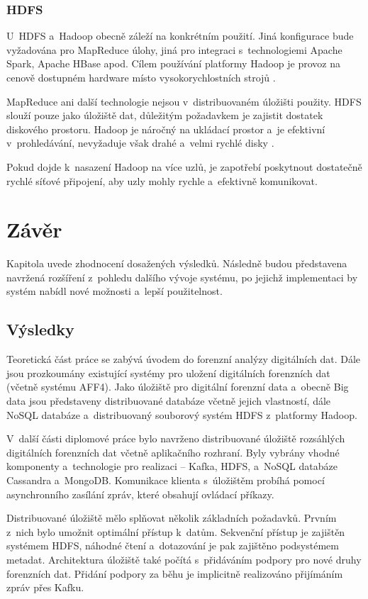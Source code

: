 \subsection{HDFS}
U~HDFS a~Hadoop obecně záleží na konkrétním použití. Jiná konfigurace bude vyžadována pro MapReduce úlohy, jiná pro integraci s~technologiemi Apache Spark, Apache HBase apod. Cílem používání platformy Hadoop je provoz na cenově dostupném hardware místo vysokorychlostních strojů \cite{hadoopHardware}.

MapReduce ani další technologie nejsou v~distribuovaném úložišti použity. HDFS slouží pouze jako úložiště dat, důležitým požadavkem je zajistit dostatek diskového prostoru. Hadoop je náročný na ukládací prostor a~je efektivní v~prohledávání, nevyžaduje však drahé a~velmi rychlé disky \cite{bestPracticesHadoopHW}.

Pokud dojde k~nasazení Hadoop na více uzlů, je zapotřebí poskytnout dostatečně rychlé síťové připojení, aby uzly mohly rychle a~efektivně komunikovat.

\chapter{Závěr}
Kapitola uvede zhodnocení dosažených výsledků. Následně budou představena navržená rozšíření z~pohledu dalšího vývoje systému, po jejichž implementaci by systém nabídl nové možnosti a~lepší použitelnost.

\section{Výsledky}
Teoretická část práce se zabývá úvodem do forenzní analýzy digitálních dat. Dále jsou prozkoumány existující systémy pro uložení digitálních forenzních dat (včetně systému AFF4). Jako úložiště pro digitální forenzní data a~obecně Big data jsou představeny distribuované databáze včetně jejich vlastností, dále NoSQL databáze a~distribuovaný souborový systém HDFS z~platformy Hadoop.

V~další části diplomové práce bylo navrženo distribuované úložiště rozsáhlých digitálních forenzních dat včetně aplikačního rozhraní. Byly vybrány vhodné komponenty a~technologie pro realizaci -- Kafka, HDFS, a~NoSQL databáze Cassandra a~MongoDB. Komunikace klienta s~úložištěm probíhá pomocí asynchronního zasílání zpráv, které obsahují ovládací příkazy.

Distribuované úložiště mělo splňovat několik základních požadavků. Prvním z~nich bylo umožnit optimální přístup k~datům. Sekvenční přístup je zajištěn systémem HDFS, náhodné čtení a~dotazování je pak zajištěno podsystémem metadat.
Architektura úložiště také počítá s~přidáváním podpory pro nové druhy forenzních dat. Přidání podpory za běhu je implicitně realizováno přijímáním zpráv přes Kafku.

